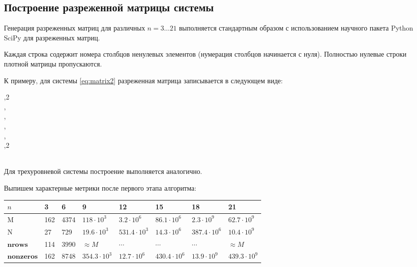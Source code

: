 \subsection{Построение разреженной матрицы системы}\label{subsec:ch4/subsect1}
Генерация разреженных матриц для различных $n = 3\dots21$ выполняется стандартным
образом с использованием научного пакета Python SciPy для разреженных матриц.

Каждая строка содержит номера столбцов ненулевых элементов (нумерация столбцов
начинается с нуля). Полностью нулевые строки плотной матрицы пропускаются.

К примеру, для системы \eqref{eq:matrix2} разреженная матрица записывается в следующем виде:
\begin{flushleft}
	\noindent {},2\\
	\noindent{},\\
	\noindent{},\\
	\noindent{},\\
	\noindent{},\\
	\noindent{},2\\
\end{flushleft}\label{eq:sparse_matrix2}
\
\\[12pt]
\noindent Для трехуровневой системы построение выполняется аналогично.

\clearpage
\noindent Выпишем характерные метрики после первого этапа алгоритма:

\noindent
{\footnotesize
	\begin{tabular}[t]{|p{5em}|p{3em}|p{4em}|p{5em}|p{5em}|p{5em}|p{5em}|p{5em}|}
		\hline
		$n$ & 3 & 6 & 9 & 12 & 15 & 18 & 21 \\
		\hline
		$\mathrm{M}$ & 162 & 4374 & $118 \cdot 10^{3}$ & $3.2 \cdot 10^{6}$ & $86.1 \cdot 10^{6}$ & $2.3 \cdot 10^{9}$ & $62.7 \cdot 10^{9}$ \\
		\hline
		$\mathrm{N}$ & 27 & 729 & $19.6 \cdot 10^{3}$ & $531.4 \cdot 10^{3}$ & $14.3 \cdot 10^{6}$ & $387.4 \cdot 10^{6}$ & $10.4 \cdot 10^{9}$ \\
		\hline
		$\mathbf{nrows}$ & 114 & 3990 & $\approx M$ & $\cdots$ & $\cdots$ & $\cdots$ & $\approx M$ \\
		\hline
		$\mathbf{nonzeros}$ & 162 & 8748 & $354.3 \cdot 10^{3}$ & $12.7 \cdot 10^{6}$ & $430.4 \cdot 10^{6}$ & $13.9 \cdot 10^{9}$ & $439.3 \cdot 10^{9}$ \\
		\hline
	\end{tabular}
}

